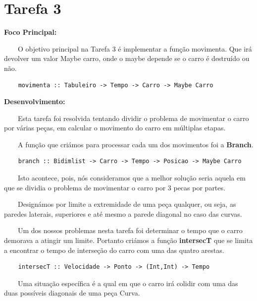 \documentclass[a4paper]{report} %
\begin{document}
           \section{Tarefa 3}
           
           \vspace{5mm} 
           \par \textbf{ Foco Principal:} 
           \par \ \ \ \  O objetivo principal na Tarefa 3 é implementar a função movimenta. Que irá devolver um valor Maybe carro, onde o maybe depende se o carro é destruído ou não.
                            \begin{verbatim}
    movimenta :: Tabuleiro -> Tempo -> Carro -> Maybe Carro 
                            \end{verbatim} 
           \par \textbf{ Desenvolvimento:} 
           \par \ \ \ \ Esta tarefa foi resolvida tentando dividir o problema de movimentar o carro por várias peças, em calcular o movimento do carro em múltiplas etapas. 
           \par \ \ \ \ A função que criámos para processar cada um dos movimentos foi a \textbf{Branch}.
                            \begin{verbatim}
    branch :: Bidimlist -> Carro -> Tempo -> Posicao -> Maybe Carro  
                            \end{verbatim}
           \par \ \ \ \ Isto acontece, pois, nós consideramos que a melhor solução seria aquela em que se dividia o problema de movimentar o carro por 3 pecas por partes.  
           \par \ \ \ \ Designámos por limite a extremidade de uma peça qualquer, ou seja, as paredes laterais, superiores e até mesmo a parede diagonal no caso das curvas. 
           \par \ \ \ \ Um dos nossos problemas nesta tarefa foi determinar o tempo que o carro demorava a atingir um limite. Portanto criámos a função \textbf{intersecT} que se limita a encontrar o tempo de interseção do carro com uma das quatro arestas.
                            \begin{verbatim}
    intersecT :: Velocidade -> Ponto -> (Int,Int) -> Tempo                           
                            \end{verbatim}
            \par \ \ \ \ Uma situação específica é a qual em que o carro irá colidir com uma das duas possíveis diagonais de uma peça Curva.
\end{document}
